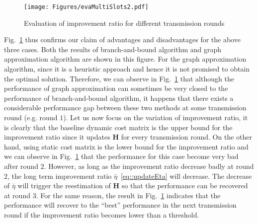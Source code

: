 %
\begin{figure}
\begin{center}
\texttt{[image: Figures/evaMultiSlots2.pdf]}
\caption{\label{fig::evaMultiSlots}Evaluation of improvement ratio for different transmission rounds}
\end{center}
\end{figure}
%
Fig.~\ref{fig::evaMultiSlots} thus confirms our claim of advantages and disadvantages for the above three cases.
Both the results of branch-and-bound algorithm and graph approximation algorithm are shown in this figure.
For the graph approximation algorithm, since it is a heuristic approach and hence it is not promised to obtain the optimal solution.
Therefore, we can observe in Fig.~\ref{fig::evaMultiSlots} that although the performance of graph approximation can sometimes be very closed to the performance of branch-and-bound algorithm, it happens that there exists a considerable performance gap between these two methods at some transmission round (e.g. round $1$).
Let us now focus on the variation of improvement ratio, it is clearly that the baseline dynamic cost matrix is the upper bound for the improvement ratio since it updates $\mathbf{H}$ for every transmission round.
On the other hand, using static cost matrix is the lower bound for the improvement ratio and we can observe in Fig.~\ref{fig::evaMultiSlots} that the performance for this case become very bad after round $2$.
However, as long as the improvement ratio decrease badly at round $2$, the long term improvement ratio $\bar{\eta}$~\eqref{eq::updateEta} will decrease.
The decrease of $\bar{\eta}$ will trigger the reestimation of $\mathbf{H}$ so that the performance can be recovered at round $3$.
For the same reason, the result in Fig.~\ref{fig::evaMultiSlots} indicates that the performance will recover to the ``best'' performance in the next transmission round if the improvement ratio becomes lower than a threshold.

